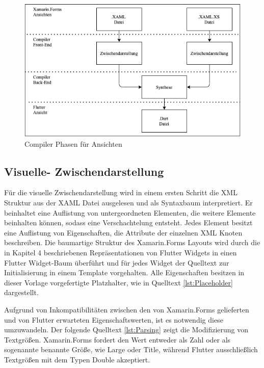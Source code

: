 \begin{figure}[!ht]
 \includegraphics[width=\textwidth,keepaspectratio]{Images/Implementation/ViewCompiler.png}
 \caption{Compiler Phasen für Ansichten}
 \label{fig:ViewCompilerPhases}
\end{figure}

\subsection{Visuelle- Zwischendarstellung}

Für die visuelle Zwischendarstellung wird in einem ersten Schritt die XML Struktur
aus der XAML Datei ausgelesen und als Syntaxbaum interpretiert.  Er beinhaltet eine Auflistung von untergeordneten Elementen,  die weitere Elemente beinhalten können,  sodass eine Verschachtelung  entsteht.  Jedes Element besitzt eine Auflistung von Eigenschaften, die Attribute der einzelnen XML Knoten beschreiben.  Die baumartige Struktur des Xamarin.Forms Layouts wird durch die in Kapitel 4 beschriebenen Repräsentationen von Flutter Widgets in einen Flutter Widget-Baum überführt und für jedes Widget der Quelltext zur Initialisierung in einem Template vorgehalten.  Alle Eigenschaften besitzen in dieser Vorlage vorgefertigte Platzhalter, wie in Quelltext \ref{lst:Placeholder} dargestellt.

 

Aufgrund von Inkompatibilitäten zwischen den von Xamarin.Forms gelieferten und von Flutter erwarteten Eigenschaftswerten, ist es notwendig diese umzuwandeln.  Der folgende Quelltext \ref{lst:Parsing} zeigt die Modifizierung von Textgrößen.  Xamarin.Forms fordert den Wert entweder als Zahl oder als sogenannte benannte Größe,  wie Large oder Title,  während Flutter ausschließlich Textgrößen mit dem Typen Double akzeptiert.   

